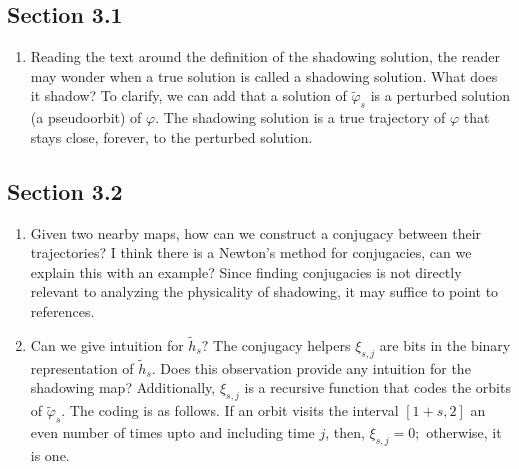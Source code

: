 \documentclass[12pt]{article}
\begin{document}
\subsection*{Section 3.1}
\begin{enumerate}
    \item Reading the text around the definition of the shadowing solution, 
    the reader may wonder when a true solution is called a shadowing solution.
    What does it shadow? To clarify, we can add that a solution of $\tilde{\varphi}_s$
    is a perturbed solution (a pseudoorbit) of $\varphi.$ The shadowing solution 
    is a true trajectory of $\varphi$ that stays close, forever, to the perturbed solution.
\end{enumerate}
\subsection*{Section 3.2}
\begin{enumerate}
    \item Given two nearby maps, how can we construct a conjugacy between their trajectories?
    I think there is a Newton's method for conjugacies, can we explain this with an example?
    Since finding conjugacies is not directly relevant to analyzing the physicality of shadowing, it may suffice to point to references. 
    \item Can we give intuition for $\tilde{h}_s?$ The conjugacy helpers $\xi_{s, j}$
    are bits in the binary representation of $\tilde{h}_s.$ Does this observation provide 
    any intuition for the shadowing map? Additionally, $\xi_{s, j}$ is a recursive function that codes the orbits of $\tilde{\varphi}_s.$ The coding is as follows. If an orbit 
    visits the interval $[1+s, 2]$ an even number of times upto and including time $j$,
    then, $\xi_{s,j} =0;$ otherwise, it is one.
\end{enumerate}
\end{document}

